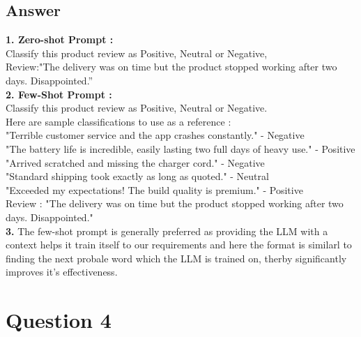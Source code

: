 \documentclass{article}
\begin{document}
\subsection{Answer}
\textbf{1. Zero-shot Prompt :}\\
\hspace*{15px}
Classify this product review as Positive, Neutral or Negative,\\
\hspace*{15px}
Review:"The delivery was on time but the product stopped working after two days. Disappointed.”
\\
\textbf{2. Few-Shot Prompt :}\\
\hspace*{15px}
Classify this product review as Positive, Neutral or Negative.\\
\hspace*{15px}
Here are sample classifications to use as a reference :\\
\hspace*{15px}
"Terrible customer service and the app crashes constantly." - Negative\\
\hspace*{15px}
"The battery life is incredible, easily lasting two full days of heavy use." - Positive\\
\hspace*{15px}
"Arrived scratched and missing the charger cord." - Negative\\
\hspace*{15px}
"Standard shipping took exactly as long as quoted." - Neutral\\
\hspace*{15px}
"Exceeded my expectations! The build quality is premium." - Positive\\
\hspace*{15px}
Review : "The delivery was on time but the product stopped working after two days. Disappointed."\\
\textbf{3. }The few-shot prompt is generally preferred as providing the LLM with a context helps it train itself to our requirements and here the format is similarl to finding the next probale word which the LLM is trained on, therby significantly improves it's effectiveness.
\\
\newpage

\section{Question 4}
\end{document}
